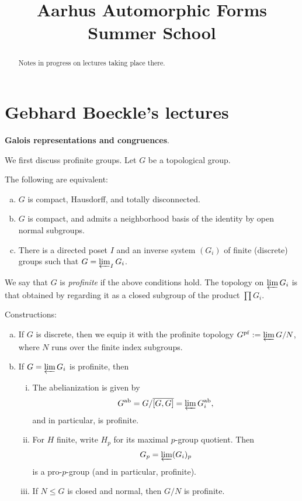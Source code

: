 \documentclass[reqno]{amsart} 
\begin{document}
\title{Aarhus Automorphic Forms Summer School}

\begin{abstract}
  Notes in progress on lectures taking place there.
\end{abstract}

\section{Gebhard Boeckle's lectures}\label{sec:cq6tho1n9f}
\textbf{Galois representations and congruences}.

We first discuss profinite groups.  Let $G$ be a topological group.

\begin{theorem}\label{theorem:cq6thpngt0}
  The following are equivalent:
  \begin{enumerate}[(a)]
  \item\label{enumerate:cq6r3e8dsb} $G$ is compact, Hausdorff, and totally disconnected.
  \item\label{enumerate:cq6r3e8eqf} $G$ is compact, and admits a neighborhood basis of the identity by open normal subgroups.
  \item\label{enumerate:cq6r3e8f6g} There is a directed poset $I$ and an inverse system $(G_i)$ of finite (discrete) groups such that $G = \varprojlim_I G_i$.
  \end{enumerate}
\end{theorem}
We say that $G$ is \emph{profinite} if the above conditions hold.  The topology on $\varprojlim G_i$ is that obtained by regarding it as a closed subgroup of the product $\prod G_i$.

Constructions:
\begin{enumerate}[(a)]
\item\label{enumerate:cq6r3e8b0y} If $G$ is discrete, then we equip it with the profinite topology $G^{\mathrm{pf}} := \varprojlim G / N$, where $N$ runs over the finite index subgroups.
\item\label{enumerate:cq6r3e8cou} If $G = \varprojlim G_i$ is profinite, then
  \begin{enumerate}[(i)]
  \item\label{enumerate:cq6r3fehbe} The abelianization is given by
    \begin{equation*}
      G^{\mathrm{ab}} = G / \overline{[G, G]} = \varprojlim G_i^{\mathrm{ab}},
    \end{equation*}
    and in particular, is profinite.
  \item\label{enumerate:cq6r3feivc} For $H$ finite, write $H_p$ for its maximal $p$-group quotient.  Then
    \begin{equation*}
      G_p = \varprojlim(G_i)_p
    \end{equation*}
    is a pro-$p$-group (and in particular, profinite).
  \item\label{enumerate:cq6r3fej61} If $N \leq G$ is closed and normal, then $G /N$ is profinite.
  \end{enumerate}
\end{enumerate}
\end{document}
